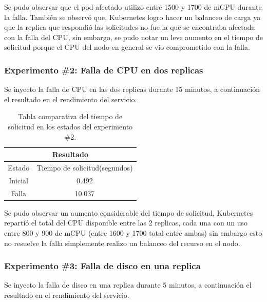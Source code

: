 \par Se pudo observar que el pod afectado utilizo entre 1500 y 1700 de mCPU durante la falla. También se observ\'o que, Kubernetes logro hacer un balanceo de carga ya que la replica que respondió las solicitudes no fue la que se encontraba afectada con la falla del CPU, sin embargo, se pudo notar un leve aumento en el tiempo de solicitud porque el CPU del nodo en general se vio comprometido con la falla.\\

\subsubsection{Experimento \#2: Falla de CPU en dos replicas}

\par Se inyecto la falla de CPU en las dos replicas durante 15 minutos, a continuación el resultado en el rendimiento del servicio.\\

\begin{table}[ht!]
\begin{center}
\begin{tabular}{ |c|c| } 
 \hline
 \multicolumn{2}{|c|}{Resultado} \\
 \hline
 \hline
 Estado & Tiempo de solicitud(segundos)\\
 \hline
 Inicial & 0.492\\
 Falla & 10.037\\
 \hline
\end{tabular}
\end{center}
\caption{Tabla comparativa del tiempo de solicitud en los estados del experimento \#2.}
\label{tab:tabla46}
\end{table}

\par Se pudo observar un aumento considerable del tiempo de solicitud, Kubernetes repartió el total del CPU disponible entre las 2 replicas, cada una con un uso entre 800 y 900 de mCPU (entre 1600 y 1700 total entre ambas) sin embargo esto no resuelve la falla simplemente realizo un balanceo del recurso en el nodo.\\

\subsubsection{Experimento \#3: Falla de disco en una replica}

\par Se inyecto la falla de disco en una replica durante 5 minutos, a continuación el resultado en el rendimiento del servicio.\\

